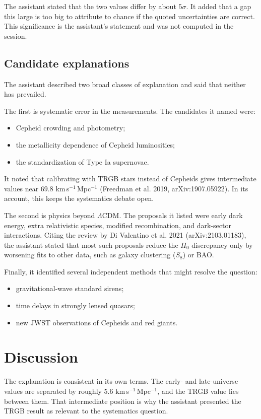 \documentclass[11pt,a4paper]{article}
\begin{document}
The assistant stated that the two values differ by about $5\sigma$. It added that a gap this large is too big to attribute to chance if the quoted uncertainties are correct. This significance is the assistant's statement and was not computed in the session.

\subsection{Candidate explanations}
The assistant described two broad classes of explanation and said that neither has prevailed.

The first is systematic error in the measurements. The candidates it named were:
\begin{itemize}
\item Cepheid crowding and photometry;
\item the metallicity dependence of Cepheid luminosities;
\item the standardization of Type Ia supernovae.
\end{itemize}
It noted that calibrating with TRGB stars instead of Cepheids gives intermediate values near $69.8$ km\,s$^{-1}$\,Mpc$^{-1}$ (Freedman et al. 2019, arXiv:1907.05922). In its account, this keeps the systematics debate open.

The second is physics beyond $\Lambda$CDM. The proposals it listed were early dark energy, extra relativistic species, modified recombination, and dark-sector interactions. Citing the review by Di Valentino et al. 2021 (arXiv:2103.01183), the assistant stated that most such proposals reduce the $H_0$ discrepancy only by worsening fits to other data, such as galaxy clustering ($S_8$) or BAO.

Finally, it identified several independent methods that might resolve the question:
\begin{itemize}
\item gravitational-wave standard sirens;
\item time delays in strongly lensed quasars;
\item new JWST observations of Cepheids and red giants.
\end{itemize}

\section{Discussion}
The explanation is consistent in its own terms. The early- and late-universe values are separated by roughly $5.6$ km\,s$^{-1}$\,Mpc$^{-1}$, and the TRGB value lies between them. That intermediate position is why the assistant presented the TRGB result as relevant to the systematics question.
\end{document}
